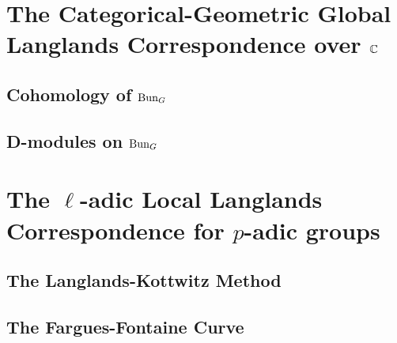     \part{The Categorical-Geometric Global Langlands Correspondence over \texorpdfstring{$\mathbb{C}$}{}}
        \chapter{Cohomology of \texorpdfstring{$\mathrm{Bun}_G$}{}}
            
            
        \chapter{D-modules on \texorpdfstring{$\mathrm{Bun}_G$}{}}
        
    \part{The \texorpdfstring{$\ell$}{}-adic Local Langlands Correspondence for \texorpdfstring{$p$}{}-adic groups}
        \chapter{The Langlands-Kottwitz Method}
            \begin{abstract}
                
            \end{abstract}
            
            \minitoc
    
        \chapter{The Fargues-Fontaine Curve}
            \begin{abstract}
                
            \end{abstract}
            
            \minitoc
            
            

            

            

